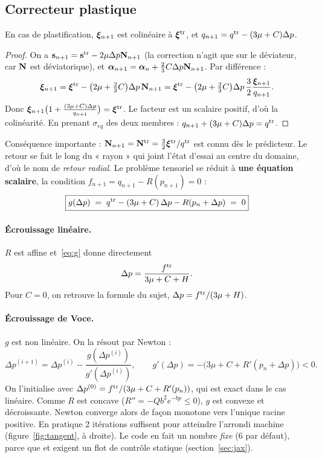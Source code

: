 \subsection{Correcteur plastique}

\begin{proposition}[Colinéarité]
En cas de plastification, $\boldsymbol{\xi}_{n+1}$ est colinéaire à $\boldsymbol{\xi}^{\mathrm{tr}}$, et $q_{n+1} = q^{\mathrm{tr}} - (3\mu+C)\Delta p$.
\end{proposition}
\begin{proof}
On a $\mathbf{s}_{n+1} = \mathbf{s}^{\mathrm{tr}} - 2\mu\Delta p\mathbf{N}_{n+1}$ (la correction n'agit que sur le déviateur, car $\mathbf{N}$ est déviatorique), et $\boldsymbol{\alpha}_{n+1} = \boldsymbol{\alpha}_n + \frac23C\Delta p\mathbf{N}_{n+1}$. Par différence :
\[
\boldsymbol{\xi}_{n+1} = \boldsymbol{\xi}^{\mathrm{tr}} - \big(2\mu+\tfrac23C\big)\Delta p\,\mathbf{N}_{n+1} = \boldsymbol{\xi}^{\mathrm{tr}} - \big(2\mu+\tfrac23C\big)\Delta p\,\frac32\frac{\boldsymbol{\xi}_{n+1}}{q_{n+1}}.
\]
Donc $\boldsymbol{\xi}_{n+1}\big(1+\frac{(3\mu+C)\Delta p}{q_{n+1}}\big) = \boldsymbol{\xi}^{\mathrm{tr}}$. Le facteur est un scalaire positif, d'où la colinéarité. En prenant $\sigma_{eq}$ des deux membres : $q_{n+1}+(3\mu+C)\Delta p = q^{\mathrm{tr}}$.
\end{proof}

Conséquence importante : $\mathbf{N}_{n+1} = \mathbf{N}^{\mathrm{tr}} = \frac32\boldsymbol{\xi}^{\mathrm{tr}}/q^{\mathrm{tr}}$ est connu dès le prédicteur. Le retour se fait le long du « rayon » qui joint l'état d'essai au centre du domaine, d'où le nom de \emph{retour radial}. Le problème tensoriel se réduit à \textbf{une équation scalaire}, la condition $f_{n+1}=q_{n+1}-R(p_{n+1})=0$ :
\begin{equation}
\boxed{\begin{aligned}
g(\Delta p) \;=\; q^{\mathrm{tr}} - (3\mu+C)\,\Delta p - R(p_n+\Delta p) \;=\; 0
\end{aligned}}
\label{eq:g}
\end{equation}

\paragraph{Écrouissage linéaire.} $R$ est affine et~\eqref{eq:g} donne directement
\[
\Delta p = \frac{f^{\mathrm{tr}}}{3\mu+C+H}.
\]
Pour $C=0$, on retrouve la formule du sujet, $\Delta p = f^{\mathrm{tr}}/(3\mu+H)$.

\paragraph{Écrouissage de Voce.} $g$ est non linéaire. On la résout par Newton :
\[
\Delta p^{(i+1)} = \Delta p^{(i)} - \frac{g(\Delta p^{(i)})}{g'(\Delta p^{(i)})},\qquad g'(\Delta p) = -\big(3\mu+C+R'(p_n+\Delta p)\big)<0.
\]
On l'initialise avec $\Delta p^{(0)}=f^{\mathrm{tr}}/(3\mu+C+R'(p_n))$, qui est exact dans le cas linéaire. Comme $R$ est concave ($R''=-Qb^2e^{-bp}\le0$), $g$ est convexe et décroissante. Newton converge alors de façon monotone vers l'unique racine positive. En pratique 2 itérations suffisent pour atteindre l'arrondi machine (figure~\ref{fig:tangent}, à droite). Le code en fait un nombre \emph{fixe} (6 par défaut), parce que  et  exigent un flot de contrôle statique (section~\ref{sec:jax}).

